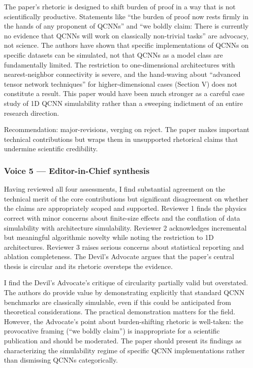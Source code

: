 \documentclass[10pt,letterpaper]{article}
\begin{document}
The paper's rhetoric is designed to shift burden of proof in a way that is not scientifically productive. Statements like ``the burden of proof now rests firmly in the hands of any proponent of QCNNs'' and ``we boldly claim: There is currently no evidence that QCNNs will work on classically non-trivial tasks'' are advocacy, not science. The authors have shown that specific implementations of QCNNs on specific datasets can be simulated, not that QCNNs as a model class are fundamentally limited. The restriction to one-dimensional architectures with nearest-neighbor connectivity is severe, and the hand-waving about ``advanced tensor network techniques'' for higher-dimensional cases (Section V) does not constitute a result. This paper would have been much stronger as a careful case study of 1D QCNN simulability rather than a sweeping indictment of an entire research direction.

Recommendation: major-revisions, verging on reject. The paper makes important technical contributions but wraps them in unsupported rhetorical claims that undermine scientific credibility.

\hypertarget{voice-5-editor-in-chief-synthesis}{%
\subsubsection{Voice 5 --- Editor-in-Chief synthesis}\label{voice-5-editor-in-chief-synthesis}}

Having reviewed all four assessments, I find substantial agreement on the technical merit of the core contributions but significant disagreement on whether the claims are appropriately scoped and supported. Reviewer 1 finds the physics correct with minor concerns about finite-size effects and the conflation of data simulability with architecture simulability. Reviewer 2 acknowledges incremental but meaningful algorithmic novelty while noting the restriction to 1D architectures. Reviewer 3 raises serious concerns about statistical reporting and ablation completeness. The Devil's Advocate argues that the paper's central thesis is circular and its rhetoric oversteps the evidence.

I find the Devil's Advocate's critique of circularity partially valid but overstated. The authors do provide value by demonstrating explicitly that standard QCNN benchmarks are classically simulable, even if this could be anticipated from theoretical considerations. The practical demonstration matters for the field. However, the Advocate's point about burden-shifting rhetoric is well-taken: the provocative framing (``we boldly claim'') is inappropriate for a scientific publication and should be moderated. The paper should present its findings as characterizing the simulability regime of specific QCNN implementations rather than dismissing QCNNs categorically.
\end{document}
